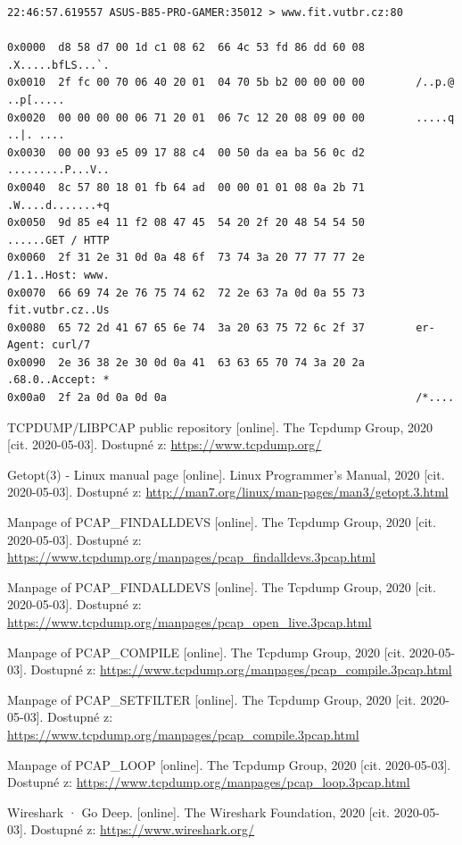 \documentclass[12pt]{article}
\begin{document}
\begin{verbatim}
22:46:57.619557 ASUS-B85-PRO-GAMER:35012 > www.fit.vutbr.cz:80

0x0000  d8 58 d7 00 1d c1 08 62  66 4c 53 fd 86 dd 60 08        .X.....bfLS...`.
0x0010  2f fc 00 70 06 40 20 01  04 70 5b b2 00 00 00 00        /..p.@ ..p[.....
0x0020  00 00 00 00 06 71 20 01  06 7c 12 20 08 09 00 00        .....q ..|. ....
0x0030  00 00 93 e5 09 17 88 c4  00 50 da ea ba 56 0c d2        .........P...V..
0x0040  8c 57 80 18 01 fb 64 ad  00 00 01 01 08 0a 2b 71        .W....d.......+q
0x0050  9d 85 e4 11 f2 08 47 45  54 20 2f 20 48 54 54 50        ......GET / HTTP
0x0060  2f 31 2e 31 0d 0a 48 6f  73 74 3a 20 77 77 77 2e        /1.1..Host: www.
0x0070  66 69 74 2e 76 75 74 62  72 2e 63 7a 0d 0a 55 73        fit.vutbr.cz..Us
0x0080  65 72 2d 41 67 65 6e 74  3a 20 63 75 72 6c 2f 37        er-Agent: curl/7
0x0090  2e 36 38 2e 30 0d 0a 41  63 63 65 70 74 3a 20 2a        .68.0..Accept: *
0x00a0  2f 2a 0d 0a 0d 0a                                       /*....
    \end{verbatim}


    \begin{thebibliography}{99}


        TCPDUMP/LIBPCAP public repository [online]. The Tcpdump Group, 2020 [cit. 2020-05-03]. Dostupné z: \url{https://www.tcpdump.org/}

        Getopt(3) - Linux manual page [online]. Linux Programmer's Manual, 2020 [cit. 2020-05-03]. Dostupné z: \url{http://man7.org/linux/man-pages/man3/getopt.3.html}

        Manpage of PCAP\_FINDALLDEVS [online]. The Tcpdump Group, 2020 [cit. 2020-05-03]. Dostupné z: \url{https://www.tcpdump.org/manpages/pcap\_findalldevs.3pcap.html}

        Manpage of PCAP\_FINDALLDEVS [online]. The Tcpdump Group, 2020 [cit. 2020-05-03]. Dostupné z: \url{https://www.tcpdump.org/manpages/pcap\_open\_live.3pcap.html}

        Manpage of PCAP\_COMPILE [online]. The Tcpdump Group, 2020 [cit. 2020-05-03]. Dostupné z: \url{https://www.tcpdump.org/manpages/pcap\_compile.3pcap.html}

        Manpage of PCAP\_SETFILTER [online]. The Tcpdump Group, 2020 [cit. 2020-05-03]. Dostupné z: \url{https://www.tcpdump.org/manpages/pcap\_compile.3pcap.html}

        Manpage of PCAP\_LOOP [online]. The Tcpdump Group, 2020 [cit. 2020-05-03]. Dostupné z: \url{https://www.tcpdump.org/manpages/pcap\_loop.3pcap.html}

        Wireshark · Go Deep. [online]. The Wireshark Foundation, 2020 [cit. 2020-05-03]. Dostupné z: \url{https://www.wireshark.org/}

    \end{thebibliography}
\end{document}
